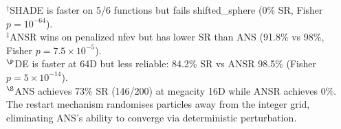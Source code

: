 \documentclass[11pt,a4paper]{article}
\begin{document}
\begin{table}[!htbp]

\small $^\dagger$SHADE is faster on 5/6 functions but fails shifted\_sphere (0\% SR, Fisher $p = 10^{-64}$). \\
\small $^\ddagger$ANSR wins on penalized nfev but has lower SR than ANS (91.8\% vs 98\%, Fisher $p = 7.5\times10^{-5}$). \\
\small $^\P$DE is faster at 64D but less reliable: 84.2\% SR vs ANSR 98.5\% (Fisher $p = 5\times10^{-14}$). \\
\small $^\S$ANS achieves 73\% SR (146/200) at megacity 16D while ANSR achieves 0\%. The restart mechanism randomises particles away from the integer grid, eliminating ANS's ability to converge via deterministic perturbation.
\end{table}
\end{document}
